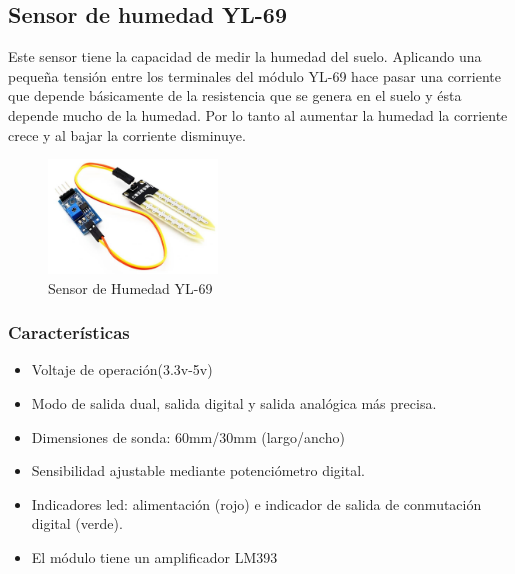 \documentclass[conference]{IEEEtran}
\begin{document}
	\subsection{Sensor de humedad YL-69}
	Este sensor tiene la capacidad de medir la humedad del suelo. Aplicando una pequeña tensión entre los terminales del módulo YL-69 hace pasar una corriente que depende básicamente de la resistencia que se genera en el suelo y ésta depende mucho de la humedad. Por lo tanto al aumentar la humedad la corriente crece y al bajar la corriente disminuye.
	\begin{figure}
		\centering
		\includegraphics[width=0.4\textwidth]{media/[YL-69] YL-69 Soil Moisture Hygrometer Detection Humidity Sensor Module For arduino Development Board DIY .jpg}
		\caption{Sensor de Humedad YL-69}
		\label{fig:enter-label}
	\end{figure}
	\subsubsection{Características}
	\begin{itemize}
		\item Voltaje de operación(3.3v-5v)
		\item Modo de salida dual, salida digital y salida analógica más precisa.
		\item Dimensiones de sonda: 60mm/30mm (largo/ancho)
		\item Sensibilidad ajustable mediante potenciómetro digital.
		\item Indicadores led: alimentación (rojo) e indicador de salida de conmutación digital (verde).
		\item El módulo tiene un amplificador LM393
	\end{itemize}
\end{document}
